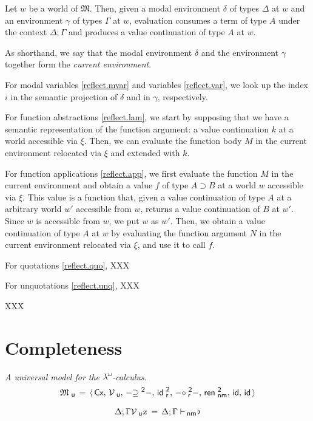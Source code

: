 \documentclass{entcs}
\numberwithin{equation}{thm}
\newcommand{\lambdabox}{\lambda^{\mkern-1mu\sq\mkern-2mu}}
\newcommand{\binop}[1]{-\mathord{#1}-}
\newcommand{\tsf}[1]{\textsf{\upshape{#1}}}
\newcommand{\stsf}[1]{\smash{\tsf{\small{#1}}}}
\renewcommand{\:}{\mathrel{:}}
\newcommand{\id}{\operatorname{\tsf{id}}}
\newcommand{\0}{\varnothing}
\newcommand{\geqZ}{\mathrel{\supseteq^{\stsf{2}}}}
\newcommand{\ideZ}{\operatorname{\tsf{id}_{\stsf{r}}^{\stsf{2}}}}
\newcommand{\compeZ}{\mathrel{\circ_{\mkern-1mu\stsf{r}}^{\stsf{2}}}}
\newcommand{\base}{\flat}
\newcommand{\imp}{\mathbin{\supset}}
\newcommand{\sq}{\Box}
\newcommand{\Cx}{\tsf{Cx}}
\newcommand{\enm}{\mathrel{\vdash_{\mkern-2mu\stsf{nm}}}}
\newcommand{\rennmZ}{\operatorname{\tsf{ren}_{\stsf{nm}}^{\stsf{2}}}}
\newcommand{\M}{\mathfrak{M}}
\newcommand{\Mu}{\mathfrak{M}_{\stsf{u}}}
\newcommand{\Vu}{\mathcal{V}_{\stsf{u}}}
\begin{document}
Let $w$ be a world of $\M$.  
Then, given a modal environment $\delta$ of types $\Delta$ at $w$ and an environment $\gamma$ of types $\Gamma$ at $w$, evaluation consumes a term of type $A$ under the context $\Delta; \Gamma$ and produces a value continuation of type $A$ at $w$.

As shorthand, we say that the modal environment $\delta$ and the environment $\gamma$ together form the \emph{current environment}.

For modal variables \eqref{reflect.mvar} and variables \eqref{reflect.var}, we look up the index $i$ in the semantic projection of $\delta$ and in $\gamma$, respectively.

For function abstractions \eqref{reflect.lam}, we start by supposing that we have a semantic representation of the function argument: a value continuation $k$ at a world accessible via $\xi$.
Then, we can evaluate the function body $M$ in the current environment relocated via $\xi$ and extended with $k$.

For function applications \eqref{reflect.app}, we first evaluate the function $M$ in the current environment and obtain a value $f$ of type $A \imp B$ at a world $w$ accessible via $\xi$.
This value is a function that, given a value continuation of type $A$ at a arbitrary world $w'$ accessible from $w$, returns a value continuation of $B$ at $w'$.
Since $w$ is accessible from $w$, we put $w$ as $w'$.
Then, we obtain a value continuation of type $A$ at $w$ by evaluating the function argument $N$ in the current environment relocated via $\xi$, and use it to call $f$.

For quotations \eqref{reflect.quo}, XXX

For unquotations \eqref{reflect.unq}, XXX


XXX


\section{Completeness}

\begin{definition}
  \label{Mu}
  \emph{A universal model for the $\lambdabox$-calculus.}
  \begin{gather*}
    \Mu \,=\, \langle\,\Cx,\,\Vu,\,\binop{\geqZ},\,\ideZ,\,\binop{\compeZ},\,\rennmZ,\,\id,\,\id\,\rangle\\[0.5\baselineskip]
    \Delta; \Gamma \Vu x \,=\, \Delta; \Gamma \enm \mkern-4mu \base
  \end{gather*}
\end{definition}
\end{document}
